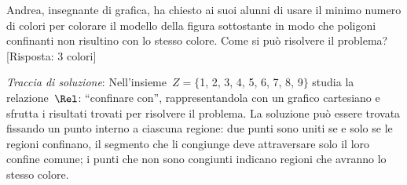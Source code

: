 \begin{esercizio}
\label{ese:7.59}
Andrea, insegnante di grafica, ha chiesto ai suoi alunni di usare il minimo numero di colori per colorare il modello della figura %
sottostante in modo che poligoni confinanti non risultino con lo stesso colore. Come si può risolvere il problema? [Risposta: 3 colori]
\pagebreak

\emph{Traccia di soluzione}: Nell'insieme~$Z =\{$1, 2, 3, 4, 5, 6, 7, 8, 9$\}$ studia la relazione~$\Rel$: ``confinare con'', rappresentandola con un grafico cartesiano e sfrutta
i risultati trovati per risolvere il problema.
La soluzione può essere trovata fissando un punto interno a ciascuna regione: due punti sono uniti se e solo se le regioni confinano, il segmento che li congiunge
deve attraversare solo il loro confine comune; i punti che non sono congiunti indicano regioni che avranno lo stesso colore.
\begin{center}
 
\end{center}
\end{esercizio}
